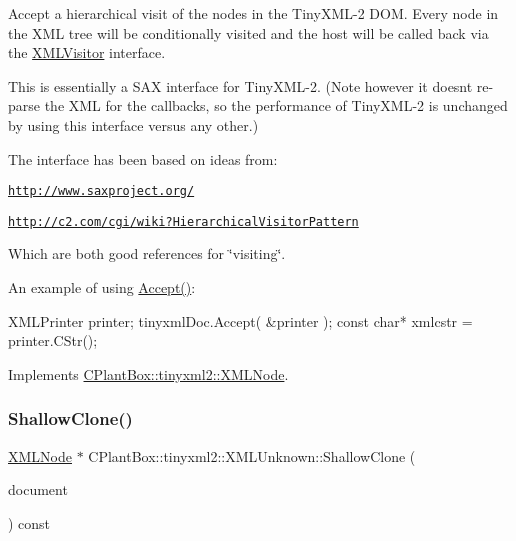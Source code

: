 Accept a hierarchical visit of the nodes in the Tiny\+X\+M\+L-\/2 D\+OM. Every node in the X\+ML tree will be conditionally visited and the host will be called back via the \hyperlink{classCPlantBox_1_1tinyxml2_1_1XMLVisitor}{X\+M\+L\+Visitor} interface.

This is essentially a S\+AX interface for Tiny\+X\+M\+L-\/2. (Note however it doesn\textquotesingle{}t re-\/parse the X\+ML for the callbacks, so the performance of Tiny\+X\+M\+L-\/2 is unchanged by using this interface versus any other.)

The interface has been based on ideas from\+:


\begin{DoxyItemize}
\item \href{http://www.saxproject.org/}{\tt http\+://www.\+saxproject.\+org/}
\item \href{http://c2.com/cgi/wiki?HierarchicalVisitorPattern}{\tt http\+://c2.\+com/cgi/wiki?\+Hierarchical\+Visitor\+Pattern}
\end{DoxyItemize}

Which are both good references for \char`\"{}visiting\char`\"{}.

An example of using \hyperlink{classCPlantBox_1_1tinyxml2_1_1XMLUnknown_a706a5d7b3056facf31ba66a316ddf912}{Accept()}\+: \begin{DoxyVerb}XMLPrinter printer;
tinyxmlDoc.Accept( &printer );
const char* xmlcstr = printer.CStr();
\end{DoxyVerb}
 

Implements \hyperlink{classCPlantBox_1_1tinyxml2_1_1XMLNode_a2cdc6f044bd1f971e211328e42a4f9d5}{C\+Plant\+Box\+::tinyxml2\+::\+X\+M\+L\+Node}.

\mbox{\label{classCPlantBox_1_1tinyxml2_1_1XMLUnknown_ae4ab3d5b1c02b09ad91729cc12f2e08e}} 
\subsubsection{\texorpdfstring{Shallow\+Clone()}{ShallowClone()}}
{\footnotesize\ttfamily \hyperlink{classCPlantBox_1_1tinyxml2_1_1XMLNode}{X\+M\+L\+Node} $\ast$ C\+Plant\+Box\+::tinyxml2\+::\+X\+M\+L\+Unknown\+::\+Shallow\+Clone (\begin{DoxyParamCaption}\item[{\hyperlink{classCPlantBox_1_1tinyxml2_1_1XMLDocument}{X\+M\+L\+Document} $\ast$}]{document }\end{DoxyParamCaption}) const\hspace{0.3cm}{\ttfamily [virtual]}}

